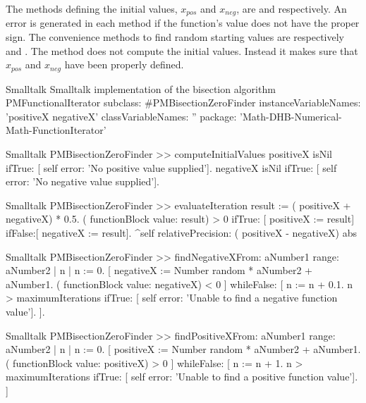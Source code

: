The methods defining the initial values, $x_{pos}$ and $x_{neg}$, are  and  respectively.
An error is generated in each method if the function's value does not have the proper sign.
The convenience methods to find random starting values are respectively  and .
The method  does not compute the initial values. Instead it makes sure that $x_{pos}$ and $x_{neg}$ have been properly defined.

\begin{listing}[label=lst:bisection]{Smalltalk}
{Smalltalk implementation of the bisection algorithm}
PMFunctionalIterator subclass: #PMBisectionZeroFinder
   instanceVariableNames: 'positiveX negativeX'
   classVariableNames: ''
   package: 'Math-DHB-Numerical-Math-FunctionIterator'
\end{listing}

\begin{displaycode}{Smalltalk}
PMBisectionZeroFinder >> computeInitialValues
    positiveX isNil
        ifTrue: [ self error: 'No positive value supplied'].
    negativeX isNil
        ifTrue: [ self error: 'No negative value supplied'].
\end{displaycode}

\begin{displaycode}{Smalltalk}
PMBisectionZeroFinder >> evaluateIteration
    result := ( positiveX + negativeX) * 0.5.
    ( functionBlock value: result) > 0
        ifTrue: [ positiveX := result]
        ifFalse:[ negativeX := result].
    ^self relativePrecision: ( positiveX - negativeX) abs
\end{displaycode}

\begin{displaycode}{Smalltalk}
PMBisectionZeroFinder >> findNegativeXFrom: aNumber1 range: aNumber2
    | n |
    n := 0.
    [ negativeX := Number random * aNumber2 + aNumber1.
      ( functionBlock value: negativeX) < 0
        ] whileFalse: [ n := n + 0.1.
                        n > maximumIterations
                            ifTrue: [ self error: 'Unable to find a 
                                            negative function value'].
                      ].
\end{displaycode}

\begin{displaycode}{Smalltalk}
PMBisectionZeroFinder >> findPositiveXFrom: aNumber1 range: aNumber2
    | n |
    n := 0.
    [ positiveX := Number random * aNumber2 + aNumber1.
      ( functionBlock value: positiveX) > 0
        ] whileFalse: [ n := n + 1.
                        n > maximumIterations
                            ifTrue: [ self error: 'Unable to find a 
                                            positive function value'].
                      ]
\end{displaycode}

